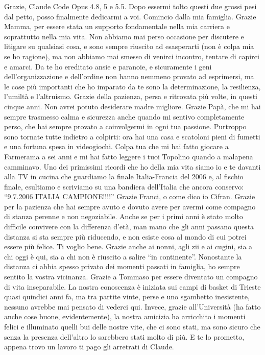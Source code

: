 Grazie, Claude Code Opus 4.8, 5 e 5.5.
\newline
Dopo essermi tolto questi due grossi pesi dal petto, posso finalmente dedicarmi a voi.
\newline
Comincio dalla mia famiglia.
\newline
Grazie Mamma, per essere stata un supporto fondamentale nella mia carriera e soprattutto nella mia vita. Non abbiamo mai perso occasione per discutere e litigare su qualsiasi cosa, e sono sempre riuscito ad esasperarti (non è colpa mia se ho ragione), ma non abbiamo mai smesso di venirci incontro, tentare di capirci e amarci. Da te ho ereditato ansie e paranoie, e sicuramente i geni dell'organizzazione e dell'ordine non hanno nemmeno provato ad esprimersi, ma le cose più importanti che ho imparato da te sono la determinazione, la resilienza, l'umiltà e l'altruismo. Grazie della pazienza, persa e ritrovata più volte, in questi cinque anni. Non avrei potuto desiderare madre migliore.
\newline
Grazie Papà, che mi hai sempre trasmesso calma e sicurezza anche quando mi sentivo completamente perso, che hai sempre provato a coinvolgermi in ogni tua passione. Purtroppo sono tornate tutte indietro a colpirti: ora hai una casa e scatoloni pieni di fumetti e una fortuna spesa in videogiochi. Colpa tua che mi hai fatto giocare a Farmerama a sei anni e mi hai fatto leggere i tuoi Topolino quando a malapena camminavo. Uno dei primissimi ricordi che ho della mia vita siamo io e te davanti alla TV in cucina che guardiamo la finale Italia-Francia del 2006 e, al fischio finale, esultiamo e scriviamo su una bandiera dell'Italia che ancora conservo: ``9.7.2006 ITALIA CAMPIONE!!!!''
\newline
Grazie Franci, o come dico io Cifran. Grazie per la pazienza che hai sempre avuto e dovuto avere per avermi come compagno di stanza perenne e non negoziabile. Anche se per i primi anni è stato molto difficile convivere con la differenza d'età, man mano che gli anni passano questa distanza si sta sempre più riducendo, e non esiste cosa al mondo di cui potrei essere più felice. Ti voglio bene.
\newline
Grazie anche ai nonni, agli zii e ai cugini, sia a chi oggi è qui, sia a chi non è riuscito a salire ``in continente''. Nonostante la distanza ci abbia spesso privato dei momenti passati in famiglia, ho sempre sentito la vostra vicinanza.
\newline
Grazie a Tommaso per essere diventato un compagno di vita inseparabile. La nostra conoscenza è iniziata sui campi di basket di Trieste quasi quindici anni fa, ma tra partite vinte, perse e uno sgambetto inesistente, nessuno avrebbe mai pensato di vederci qui. Invece, grazie all'Università (ha fatto anche cose buone, evidentemente), la nostra amicizia ha arricchito i momenti felici e illuminato quelli bui delle nostre vite, che ci sono stati, ma sono sicuro che senza la presenza dell'altro lo sarebbero stati molto di più. E te lo prometto, appena trovo un lavoro ti pago gli arretrati di Claude.
